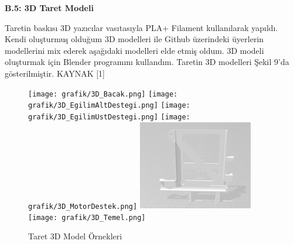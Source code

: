 \textbf{B.5: 3D Taret Modeli}
\label{SekizinciBolum}

Taretin baskısı 3D yazıcılar vasıtasıyla PLA+  Filament kullanılarak yapıldı. Kendi oluşturmuş olduğum 3D modelleri ile Github üzerindeki üyerlerin modellerini mix ederek aşağıdaki modelleri elde etmiş oldum. 3D modeli oluşturmak için Blender programını kullandım. Taretin 3D modelleri Şekil 9’da gösterilmiştir. KAYNAK [1]

\begin{figure}[H]
	\centering
	\texttt{[image: grafik/3D\_Bacak.png]}
    \texttt{[image: grafik/3D\_EgilimAltDestegi.png]}
    \texttt{[image: grafik/3D\_EgilimUstDestegi.png]}
    \texttt{[image: grafik/3D\_MotorDestek.png]}
    \includegraphics[width=50mm]{grafik/3D_NamluPlatformu.png}
    \texttt{[image: grafik/3D\_Temel.png]}
    
    \caption{Taret 3D Model Örnekleri}
    \label{fig:Taret1,2,3,4,5,6DM}
\end{figure}

\clearpage